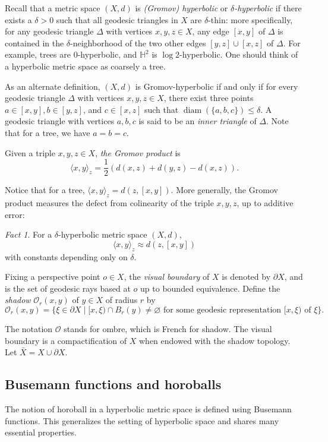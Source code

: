 \documentclass[11pt]{amsart}
\theoremstyle{plain}
\theoremstyle{definition}
\theoremstyle{remark}
\newtheorem{fact}[proposition]{Fact}
\DeclareMathOperator{\diam}{diam}
\begin{document}
Recall that a metric space $(X,d)$ is {\em (Gromov) hyperbolic} or {\em
$\delta$-hyperbolic} if there exists a $\delta>0$ such that all geodesic
triangles in $X$ are $\delta$-thin: more specifically, for any geodesic
triangle $\Delta$ with vertices $x,y,z\in X$,
any edge $[x,y]$ of $\Delta$ is contained in the
$\delta$-neighborhood of the two other edges $[y,z]\cup [x,z]$ 
of $\Delta$. For example,
trees are 0-hyperbolic, and $\mathbb H^2$ is $\log 2$-hyperbolic. One
should think of a hyperbolic metric space as coarsely a tree. 

As an alternate definition, $(X,d)$ is Gromov-hyperbolic if and only if
for every geodesic triangle $\Delta$ with vertices $x,y,z\in
X$, there exist three points
$a\in[x,y],b\in[y,z]$, and $c\in[x,z]$ such that $\diam(\{a,b,c\})\leq
\delta$. A geodesic triangle with vertices $a,b,c$ is said to be an
{\em inner triangle} of $\Delta$. Note that for a tree, we have $a=b=c$. 

Given a triple $x,y,z\in X$, {\em the Gromov product} is 
\[
  \langle x,y\rangle_z=\frac12(d(x,z)+d(y,z)-d(x,z)).
\]

Notice that for a tree, $\langle x,y\rangle_z=d(z,[x,y])$. More
generally, 
the Gromov product measures the defect from colinearity of the triple
$x,y,z$, up to additive error:  


\begin{fact}
  For a $\delta$-hyperbolic metric space $(X,d)$, 
  \[
    \langle x,y\rangle_z\approx d(z,[x,y])
  \]
  with constants depending only on $\delta$. 
\end{fact}


Fixing a perspective point $o\in X$, the {\em visual boundary} of
$X$ is denoted by $\partial X$, and is the set of geodesic rays based at
$o$ up to bounded equivalence. Define the {\em shadow} $\mathcal
O_r(x,y)$ of $y\in X$ of
radius $r$ by 
\[
  \mathcal O_r(x,y)=\{\xi\in\partial X\mid [x,\xi)\cap B_r(y)\neq \varnothing
    \text{ for some geodesic representation }[x,\xi)\text{ of }\xi
\}.
\]

The notation $\mathcal O$ stands for ombre, which is French for shadow. 
The visual boundary is a compactification of
$X$ when endowed with the shadow topology. Let $\bar{X}=X\cup\partial X$. 

\subsection{Busemann functions and horoballs}

The notion of horoball in a hyperbolic metric space is defined using
Busemann functions. This generalizes the setting of hyperbolic space and
shares many essential properties.
\end{document}
